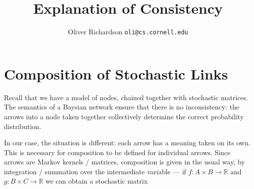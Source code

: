 \documentclass{article}
\title{Explanation of Consistency}
\author{Oliver Richardson  \texttt{oli@cs.cornell.edu}}
\begin{document}

%	
%	


%	

	
	\section{Composition of Stochastic Links}
	Recall that we have a model of nodes, chained together with stochastic matrices. The semantics of a Baysian network ensure that there is no inconsistency: the arrows into a node taken together collectively determine the correct probability distribution.
	
	In our case, the situation is different: each arrow has a meaning taken on its own. This is necessary for composition to be defined for individual arrows. Since arrows are Markov kernels / matrices, composition is given in the usual way, by integration / summation over the intermediate variable --- if $f : A \times B \to \mathbb R$ and $g : B \times C \to \mathbb R$ we can obtain a stochastic matrix
	
\end{document}
